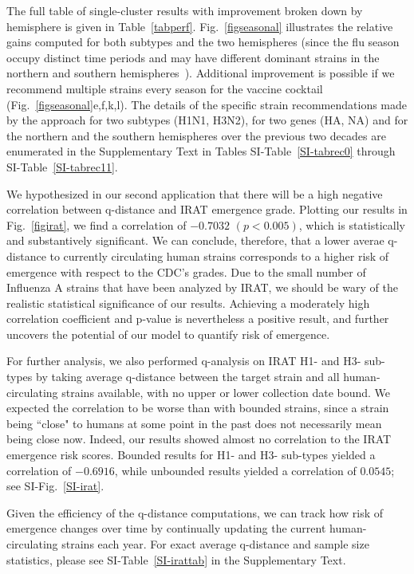 \documentclass[onecolumn, compsoc,10pt]{IEEEtran}
\begin{document}
The full table of single-cluster results with improvement broken down by hemisphere is given in Table~\ref{tabperf}. Fig.~\ref{figseasonal} illustrates the relative gains computed for both subtypes and the two hemispheres (since the flu season occupy distinct time periods and may have different dominant strains in the northern and southern hemispheres~\cite{boni2008vaccination}). Additional improvement is possible if we recommend multiple strains every season for the vaccine cocktail (Fig.~\ref{figseasonal}e,f,k,l). The details of the specific strain  recommendations made by the \qnet approach for two subtypes (H1N1, H3N2), for two genes (HA, NA) and for the northern and the southern hemispheres over the previous two decades are enumerated in the Supplementary Text in Tables SI-Table~\ref{SI-tabrec0} through SI-Table~\ref{SI-tabrec11}.

We hypothesized in our second application that there will be a high negative correlation between q-distance and IRAT emergence grade. Plotting our results in Fig.~\ref{figirat}, we find a correlation of $-0.7032$ $(p < 0.005)$, which is statistically and substantively significant. We can conclude, therefore, that a lower averae q-distance to currently circulating human strains corresponds to a higher risk of emergence with respect to the CDC's grades. Due to the small number of Influenza A strains that have been analyzed by IRAT, we should be wary of the realistic statistical significance of our results. Achieving a moderately high correlation coefficient and p-value is nevertheless a positive result, and further uncovers the potential of our model to quantify risk of emergence. 

For further analysis, we also performed q-analysis on IRAT H1- and H3- sub-types by taking average q-distance between the target strain and all human-circulating strains available, with no upper or lower collection date bound. We expected the correlation to be worse than with bounded strains, since a strain being ``close" to humans at some point in the past does not necessarily mean being close now. Indeed, our results showed almost no correlation to the IRAT emergence risk scores. Bounded results for H1- and H3- sub-types yielded a correlation of $-0.6916$, while unbounded results yielded a correlation of $0.0545$; see SI-Fig.~\ref{SI-irat}.

Given the efficiency of the q-distance computations, we can track how risk of emergence changes over time by continually updating the current human-circulating strains each year. For exact average q-distance and \qnet sample size statistics, please see SI-Table~\ref{SI-irattab} in the Supplementary Text.
\end{document}
